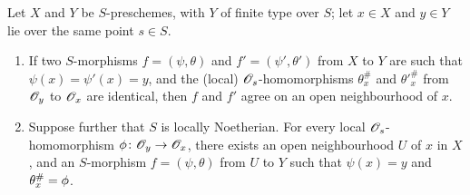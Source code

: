 \begin{prop}[6.5.1]
\label{1.6.5.1}
Let $X$ and $Y$ be $S$-preschemes, with $Y$ of finite type over $S$;
let $x\in X$ and $y\in Y$ lie over the same point $s\in S$.
\begin{enumerate}[label=\rm(\roman*)]
    \item If two $S$-morphisms $f=(\psi,\theta)$ and $f'=(\psi',\theta')$ from $X$ to $Y$ are such that $\psi(x)=\psi'(x)=y$, and the (local) $\mathscr{O}_s$-homomorphisms $\theta_x^\#$ and $\theta'^{\#}_x$ from $\mathscr{O}_y$ to $\mathscr{O}_x$ are identical, then $f$ and $f'$ agree on an open neighbourhood of $x$.
    \item Suppose further that $S$ is locally Noetherian.
        For every local $\mathscr{O}_s$-homomorphism $\phi\colon\mathscr{O}_y\to\mathscr{O}_x$, there exists an open neighbourhood $U$ of $x$ in $X$, and an $S$-morphism $f=(\psi,\theta)$ from $U$ to $Y$ such that $\psi(x)=y$ and $\theta_x^\#=\phi$.
\end{enumerate}
\end{prop}

